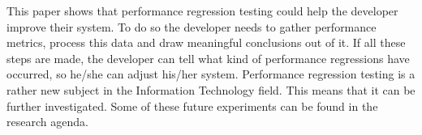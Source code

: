 This paper shows that performance regression testing could help the developer improve their system. To do so the developer needs to gather performance metrics, process this data and draw meaningful conclusions out of it. If all these steps are made, the developer can tell what kind of performance regressions have occurred, so he/she can adjust his/her system. Performance regression testing is a rather new subject in the Information Technology field. This means that it can be further investigated. Some of these future experiments can be found in the research agenda.
